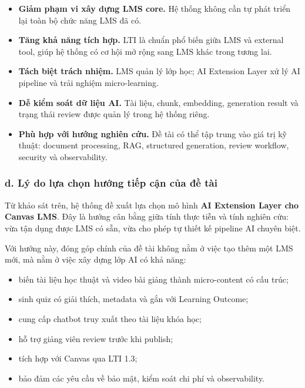 \begin{itemize}
    \item \textbf{Giảm phạm vi xây dựng LMS core.} Hệ thống không cần tự phát
          triển lại toàn bộ chức năng LMS đã có.
    \item \textbf{Tăng khả năng tích hợp.} LTI là chuẩn phổ biến giữa LMS và
          external tool, giúp hệ thống có cơ hội mở rộng sang LMS khác trong
          tương lai.
    \item \textbf{Tách biệt trách nhiệm.} LMS quản lý lớp học; AI Extension
          Layer xử lý AI pipeline và trải nghiệm micro-learning.
    \item \textbf{Dễ kiểm soát dữ liệu AI.} Tài liệu, chunk, embedding,
          generation result và trạng thái review được quản lý trong hệ thống
          riêng.
    \item \textbf{Phù hợp với hướng nghiên cứu.} Đề tài có thể tập trung vào
          giá trị kỹ thuật: document processing, RAG, structured generation,
          review workflow, security và observability.
\end{itemize}

\subsubsection*{d. Lý do lựa chọn hướng tiếp cận của đề tài}

Từ khảo sát trên, hệ thống đề xuất lựa chọn mô hình \textbf{AI Extension Layer
cho Canvas LMS}. Đây là hướng cân bằng giữa tính thực tiễn và tính nghiên cứu:
vừa tận dụng được LMS có sẵn, vừa cho phép tự thiết kế pipeline AI chuyên biệt.

Với hướng này, đóng góp chính của đề tài không nằm ở việc tạo thêm một LMS mới,
mà nằm ở việc xây dựng lớp AI có khả năng:

\begin{itemize}
    \item biến tài liệu học thuật và video bài giảng thành micro-content có cấu
          trúc;
    \item sinh quiz có giải thích, metadata và gắn với Learning Outcome;
    \item cung cấp chatbot truy xuất theo tài liệu khóa học;
    \item hỗ trợ giảng viên review trước khi publish;
    \item tích hợp với Canvas qua LTI 1.3;
    \item bảo đảm các yêu cầu về bảo mật, kiểm soát chi phí và observability.
\end{itemize}

